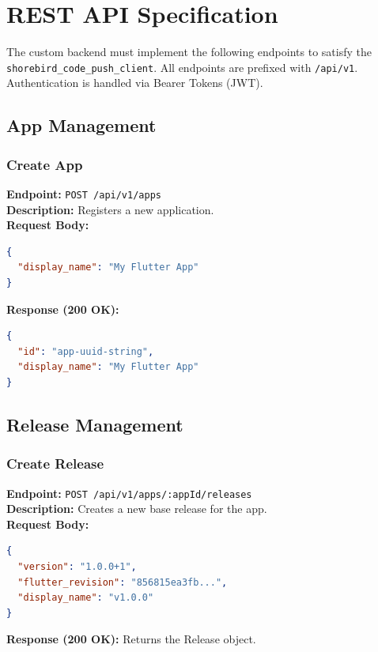 \documentclass[12pt,a4paper]{article}
\begin{document}
\newpage

\section{REST API Specification}
The custom backend must implement the following endpoints to satisfy the \texttt{shorebird\_code\_push\_client}. All endpoints are prefixed with \texttt{/api/v1}. Authentication is handled via Bearer Tokens (JWT).

\subsection{App Management}

\subsubsection{Create App}
\textbf{Endpoint:} \texttt{POST /api/v1/apps} \\
\textbf{Description:} Registers a new application. \\
\textbf{Request Body:}
\begin{lstlisting}[language=json]
{
  "display_name": "My Flutter App"
}
\end{lstlisting}
\textbf{Response (200 OK):}
\begin{lstlisting}[language=json]
{
  "id": "app-uuid-string",
  "display_name": "My Flutter App"
}
\end{lstlisting}

\subsection{Release Management}

\subsubsection{Create Release}
\textbf{Endpoint:} \texttt{POST /api/v1/apps/:appId/releases} \\
\textbf{Description:} Creates a new base release for the app. \\
\textbf{Request Body:}
\begin{lstlisting}[language=json]
{
  "version": "1.0.0+1",
  "flutter_revision": "856815ea3fb...",
  "display_name": "v1.0.0"
}
\end{lstlisting}
\textbf{Response (200 OK):} Returns the Release object.
\end{document}
